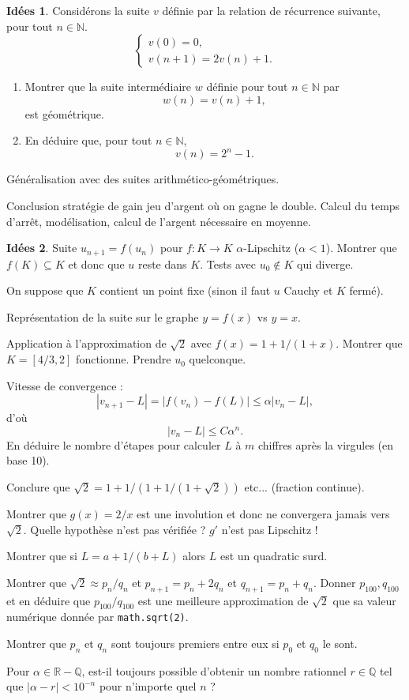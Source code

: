 \documentclass[a4paper,12pt, notitlepage]{article}
\theoremstyle{definition}
\newtheorem{idee}{Idées}
\newcommand{\N}{\mathbb{N}}
\newcommand{\Q}{\mathbb{Q}}
\newcommand{\R}{\mathbb{R}}
\begin{document}
\begin{idee}
	Considérons la suite $v$ définie par la relation de récurrence suivante, pour tout $n\in\N$.
    \[
    \begin{cases}
        v(0) = 0, \\
        v(n+1) = 2v(n) + 1.
    \end{cases}
    \]
    \begin{enumerate}
        \item Montrer que la suite intermédiaire $w$ définie pour tout $n\in\N$ par
            \[ w(n) = v(n) + 1,\]
        est géométrique.
        \item En déduire que, pour tout $n\in\N$,
            \[ v(n) = 2^n - 1.\]
    \end{enumerate}

	Généralisation avec des suites arithmético-géométriques.
	
	
	Conclusion stratégie de gain jeu d'argent où on gagne le double.
	Calcul du temps d'arrêt, modélisation, calcul de l'argent nécessaire en moyenne.
\end{idee}

\begin{idee}
	Suite $u_{n+1} = f(u_n)$ pour $f : K \rightarrow K$ $\alpha$-Lipschitz ($\alpha < 1$).
	Montrer que $f(K) \subseteq K$ et donc que $u$ reste dans $K$.
	Tests avec $u_0 \not\in K$ qui diverge.
	
	On suppose que $K$ contient un point fixe (sinon il faut $u$ Cauchy et $K$ fermé).
	
	Représentation de la suite sur le graphe $y=f(x)$ vs $y=x$.
	
	Application à l'approximation de $\sqrt{2}$ avec $f(x) =1 + 1/(1+x)$.
	Montrer que $K=[4/3,2]$ fonctionne. Prendre $u_0$ quelconque.
	
	Vitesse de convergence :
		\[ |v_{n+1} - L| = |f(v_n) - f(L)| \leq \alpha |v_n - L|, \]
	d'où
		\[ |v_n - L| \leq C \alpha^n. \]
	En déduire le nombre d'étapes pour calculer $L$ à $m$ chiffres après la virgules (en base 10).
	
	Conclure que $\sqrt{2} = 1 + 1/(1+1/(1+\sqrt{2}))$ etc... (fraction continue).
	
	Montrer que $g(x) = 2/x$ est une involution et donc ne convergera jamais vers $\sqrt{2}$. 
	Quelle hypothèse n'est pas vérifiée ? $g'$ n'est pas Lipschitz !
	
	Montrer que si $L = a + 1/(b+L)$ alors $L$ est un quadratic surd.
	
	Montrer que $\sqrt2 \approx p_n/q_n$ et $p_{n+1} = p_n + 2q_n$ et $q_{n+1} = p_n + q_n$.
	Donner $p_{100}, q_{100}$ et en déduire que $p_{100}/q_{100}$ est une meilleure approximation de $\sqrt2$ que sa valeur numérique donnée par \texttt{math.sqrt(2)}.
	
	Montrer que $p_n$ et $q_n$ sont toujours premiers entre eux si $p_0$ et $q_0$ le sont.
	
	Pour $\alpha\in\R-\Q$, est-il toujours possible d'obtenir un nombre rationnel $r\in\Q$ tel que $|\alpha - r| < 10^{-n}$ pour n'importe quel $n$ ?
\end{idee}
\end{document}
